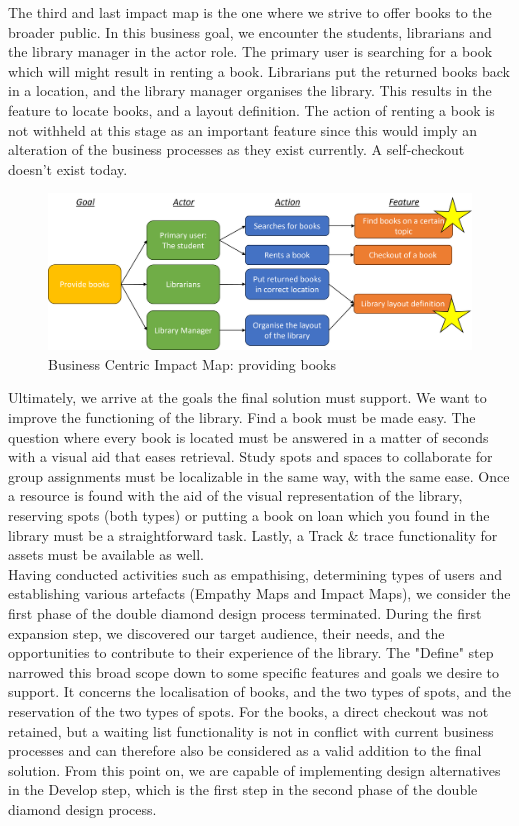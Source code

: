 \documentclass[a4paper, 11pt]{article}
\begin{document}
The third and last impact map is the one where we strive to offer books to the broader public. In this business goal, we encounter the students, librarians and the library manager in the actor role. The primary user is searching for a book which will might result in renting a book. Librarians put the returned books back in a location, and the library manager organises the library. This results in the feature to locate books, and a layout definition. The action of renting a book is not withheld at this stage as an important feature since this would imply an alteration of the business processes as they exist currently. A self-checkout doesn't exist today.
\begin{figure}[h]
	\centering
	\includegraphics[width=0.7\linewidth]{figures/ImpactMapBook}
	\caption{Business Centric Impact Map: providing books}
	\label{fig:impactmapbook}
\end{figure}
Ultimately, we arrive at the goals the final solution must support. We want to improve the functioning of the library. Find a book must be made easy. The question where every book is located must be answered in a matter of seconds with a visual aid that eases retrieval. Study spots and spaces to collaborate for group assignments must be localizable in the same way, with the same ease. Once a resource is found with the aid of the visual representation of the library, reserving spots (both types) or putting a book on loan which you found in the library must be a straightforward task. Lastly, a Track \& trace functionality for assets must be available as well.\\

Having conducted activities such as empathising, determining types of users and establishing various artefacts (Empathy Maps and Impact Maps), we consider the first phase of the double diamond design process terminated. During the first expansion step, we discovered our target audience, their needs, and the opportunities to contribute to their experience of the library. The "Define" step narrowed this broad scope down to some specific features and goals we desire to support. It concerns the localisation of books, and the two types of spots, and the reservation of the two types of spots. For the books, a direct checkout was not retained, but a waiting list functionality is not in conflict with current business processes and can therefore also be considered as a valid addition to the final solution. From this point on, we are capable of implementing design alternatives in the Develop step, which is the first step in the second phase of the double diamond design process.
\end{document}
